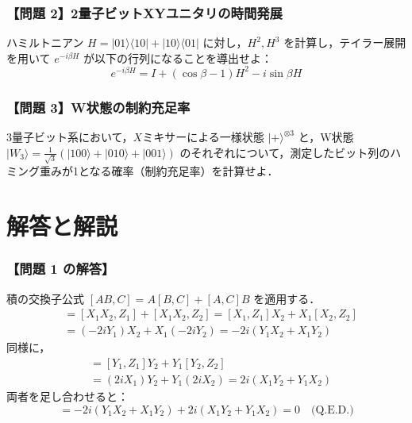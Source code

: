\documentclass[11pt,a4paper,oneside,openany]{ltjsbook}
\theoremstyle{definition}
\theoremstyle{plain}
\theoremstyle{remark}
\newcommand{\ket}[1]{|#1\rangle}
\newcommand{\bra}[1]{\langle#1|}
\begin{document}
\subsubsection*{【問題 2】2量子ビットXYユニタリの時間発展}
ハミルトニアン $H = \ket{01}\bra{10} + \ket{10}\bra{01}$ に対し，$H^2, H^3$ を計算し，テイラー展開を用いて $e^{-i \beta H}$ が以下の行列になることを導出せよ：
\begin{equation}
    e^{-i \beta H} = I + (\cos\beta - 1) H^2 - i \sin\beta H
\end{equation}

\subsubsection*{【問題 3】W状態の制約充足率}
3量子ビット系において，$X$ミキサーによる一様状態 $\ket{+}^{\otimes 3}$ と，W状態 $\ket{W_3} = \frac{1}{\sqrt{3}}(\ket{100} + \ket{010} + \ket{001})$ のそれぞれについて，測定したビット列のハミング重みが1となる確率（制約充足率）を計算せよ．

\section{解答と解説}

\subsubsection*{【問題 1 の解答】}
積の交換子公式 $[AB, C] = A[B, C] + [A, C]B$ を適用する．
\begin{align*}
    [X_1 X_2, Z_1 + Z_2] &= [X_1 X_2, Z_1] + [X_1 X_2, Z_2] = [X_1, Z_1] X_2 + X_1 [X_2, Z_2] \\
    &= (-2i Y_1) X_2 + X_1 (-2i Y_2) = -2i (Y_1 X_2 + X_1 Y_2)
\end{align*}
同様に，
\begin{align*}
    [Y_1 Y_2, Z_1 + Z_2] &= [Y_1, Z_1] Y_2 + Y_1 [Y_2, Z_2] \\
    &= (2i X_1) Y_2 + Y_1 (2i X_2) = 2i (X_1 Y_2 + Y_1 X_2)
\end{align*}
両者を足し合わせると：
\begin{equation}
    [X_1 X_2 + Y_1 Y_2, Z_1 + Z_2] = -2i(Y_1 X_2 + X_1 Y_2) + 2i(X_1 Y_2 + Y_1 X_2) = 0 \quad \text{(Q.E.D.)}
\end{equation}
\end{document}
